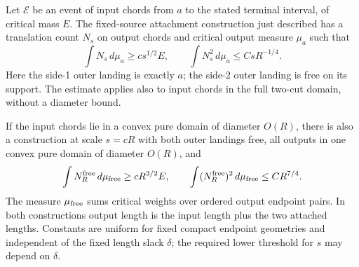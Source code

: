 \begin{proposition}\label{c:attachment-proposition}
Let $\mathcal E$ be an event of input chords from $a$ to the stated
terminal interval, of critical mass $E$. The fixed-source attachment
construction just described has a translation count $N_s$ on output
chords and critical output measure $\mu_a$ such that
\begin{equation}\label{c:attachment-moments}
 \int N_s\,d\mu_a\ge cs^{1/2}E,
 \qquad
 \int N_s^2\,d\mu_a\le CsR^{-1/4}.
\end{equation}
Here the side-1 outer landing is exactly $a$; the side-2 outer landing
is free on its support. The estimate applies also to input chords in
the full two-cut domain, without a diameter bound.

If the input chords lie in a convex pure domain of diameter $O(R)$,
there is also a construction at scale $s=cR$ with both outer landings
free, all outputs in one convex pure domain of diameter $O(R)$, and
\begin{equation}\label{c:free-attachment-moments}
 \int N_R^{\rm free}\,d\mu_{\rm free}\ge cR^{3/2}E,
 \qquad
 \int(N_R^{\rm free})^2\,d\mu_{\rm free}\le CR^{7/4}.
\end{equation}
The measure $\mu_{\rm free}$ sums critical weights over ordered output
endpoint pairs. In both constructions output length is the input length
plus the two attached lengths. Constants are uniform for fixed compact
endpoint geometries and independent of the fixed length slack $\delta$;
the required lower threshold for $s$ may depend on $\delta$.
\end{proposition}

